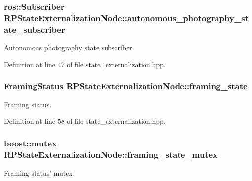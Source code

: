\hypertarget{class_r_p_state_externalization_node_ac79ccc93b04f57e17d5e1f0e225a5210}{
\subsubsection[{autonomous\-\_\-photography\-\_\-state\-\_\-subscriber}]{\setlength{\rightskip}{0pt plus 5cm}ros\-::\-Subscriber {\bf \-R\-P\-State\-Externalization\-Node\-::autonomous\-\_\-photography\-\_\-state\-\_\-subscriber}}}\label{class_r_p_state_externalization_node_ac79ccc93b04f57e17d5e1f0e225a5210}
\-Autonomous photography state subscriber. 

\-Definition at line 47 of file state\-\_\-externalization.\-hpp.

\hypertarget{class_r_p_state_externalization_node_ad435064482aa0df8a11a8b52d9e2e503}{
\subsubsection[{framing\-\_\-state}]{\setlength{\rightskip}{0pt plus 5cm}\-Framing\-Status {\bf \-R\-P\-State\-Externalization\-Node\-::framing\-\_\-state}}}\label{class_r_p_state_externalization_node_ad435064482aa0df8a11a8b52d9e2e503}
\-Framing status. 

\-Definition at line 58 of file state\-\_\-externalization.\-hpp.

\hypertarget{class_r_p_state_externalization_node_aeb8321c04369d904cdb73b4f8b86c30d}{
\subsubsection[{framing\-\_\-state\-\_\-mutex}]{\setlength{\rightskip}{0pt plus 5cm}boost\-::mutex {\bf \-R\-P\-State\-Externalization\-Node\-::framing\-\_\-state\-\_\-mutex}}}\label{class_r_p_state_externalization_node_aeb8321c04369d904cdb73b4f8b86c30d}
\-Framing status' mutex. 

